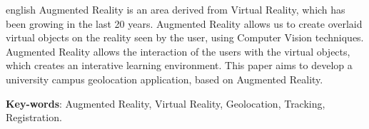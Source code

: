 \documentclass[12pt,openright,twoside,a4paper,english,french,spanish]{abntex2}
\begin{document}
\begin{resumo}[Abstract]
 \begin{otherlanguage*}{english}
    Augmented Reality is an area derived from Virtual Reality, which
    has been growing in the last 20 years. Augmented Reality allows us to create
    overlaid virtual objects on the reality seen by the user, using
    Computer Vision techniques. Augmented Reality allows the interaction of the users
    with the virtual objects, which creates an interative learning environment. 
    This paper aims to develop a university campus geolocation application, based on Augmented Reality.
    



   \vspace{\onelineskip}
 
   \noindent 
   \textbf{Key-words}: Augmented Reality, Virtual Reality, Geolocation, Tracking, Registration.
 \end{otherlanguage*}
\end{resumo}







\listoffigures
\cleardoublepage

\listoftables
\cleardoublepage


\lstlistoflistings
\cleardoublepage


\glsaddall


\printglossaries
\cleardoublepage



\tableofcontents*
\cleardoublepage
\end{document}

